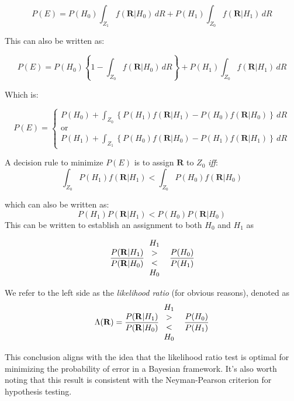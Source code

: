 \documentclass[12pt]{book}
\theoremstyle{definition}
\begin{document}
\[ P(E) = P(H_0) \int_{Z_1} f(\mathbf{R} | H_0) \, dR + P(H_1) \int_{Z_0} f(\mathbf{R} | H_1) \, dR \]



This can also be written as:

\[ P(E) = P(H_0) \left \{ 1- \int_{Z_0} f(\mathbf{R} | H_0) \, dR  \right \} + P(H_1) \int_{Z_0} f(\mathbf{R} | H_1) \, dR \]

Which is:

\[ P(E) = 
\begin{cases}
    P(H_0) +  \int_{Z_0} \left \{ P(H_1) f(\mathbf{R} | H_1) 
 - P(H_0) f(\mathbf{R} | H_0) \right \} \, dR  \\
 \text{or} \\
 P(H_1) +  \int_{Z_1} \left \{ P(H_0) f(\mathbf{R} | H_0) 
 - P(H_1) f(\mathbf{R} | H_1) \right \} \, dR
\end{cases}
\]

A decision rule to minimize \(P(E)\) is to assign \(\mathbf{R}\) to \(Z_0\) \emph{iff}:
\[
\int_{Z_0} P(H_1)f(\mathbf{R} | H_1) < \int_{Z_0} P(H_0)f(\mathbf{R} | H_0)
\]

which can also be written as:
\[
P(H_1)P(\mathbf{R}|H_1) < P(H_0)P(\mathbf{R}|H_0)
\]
This can be written to establish an assignment to both $H_0$ and $H_1$ as 

\[
\frac{P(\mathbf{R}|H_1)}{P(\mathbf{R}|H_0)}  
\begin{tabular}{c @{\hspace{2\tabcolsep}} *{5}{c}}

     \(H_1\) \\
     $>$ \\
    $<$ \\
    \(H_0\)
\end{tabular}
\frac{P(H_0)}{P(H_1)} 
\]


We refer to the left side as the \emph{likelihood ratio} (for obvious reasons), denoted as 
\[
\Lambda(\mathbf{R}) = \frac{P(\mathbf{R}|H_1)}{P(\mathbf{R}|H_0)}  
\begin{tabular}{c @{\hspace{2\tabcolsep}} *{5}{c}}

     \(H_1\) \\
     $>$ \\
    $<$ \\
    \(H_0\)
\end{tabular}
\frac{P(H_0)}{P(H_1)} 
\]


This conclusion aligns with the idea that the likelihood ratio test is optimal for minimizing the probability of error in a Bayesian framework. It's also worth noting that this result is consistent with the Neyman-Pearson criterion for hypothesis testing.
\end{document}
